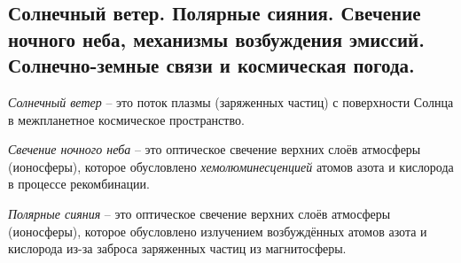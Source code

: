 \subsection{Солнечный ветер. Полярные сияния. Свечение ночного неба, механизмы возбуждения эмиссий. Солнечно-земные связи и космическая погода.}
\textit{Солнечный ветер} -- это поток плазмы (заряженных частиц) с поверхности Солнца в межпланетное космическое пространство.

\textit{Свечение ночного неба} -- это оптическое свечение верхних слоёв атмосферы (ионосферы), которое обусловлено \textit{хемолюминесценцией} атомов азота и кислорода в процессе рекомбинации.

\textit{Полярные сияния} -- это оптическое свечение верхних слоёв атмосферы (ионосферы), которое обусловлено излучением возбуждённых атомов азота и кислорода из-за заброса заряженных частиц из магнитосферы.
